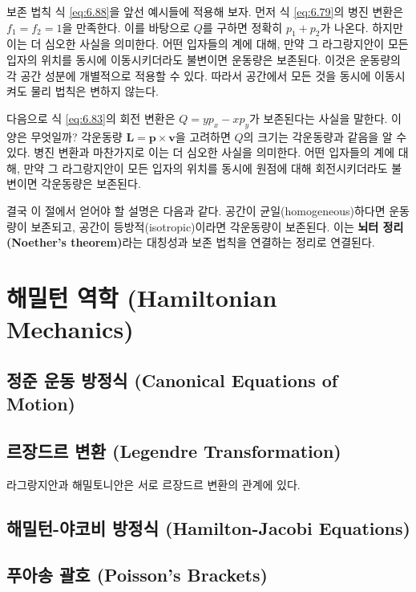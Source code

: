 \documentclass[chapter, oneside, b5paper]{oblivoir}
\theoremstyle{plain}
\theoremstyle{definition}
\theoremstyle{remark}
\begin{document}
보존 법칙 식 \ref{eq:6.88}을 앞선 예시들에 적용해 보자. 먼저 식 \ref{eq:6.79}의 병진 변환은 $f_1 = f_2 = 1$을 만족한다. 이를 바탕으로 $Q$를 구하면 정확히 $p_1 + p_2$가 나온다. 하지만 이는 더 심오한 사실을 의미한다. 어떤 입자들의 계에 대해, 만약 그 라그랑지안이 모든 입자의 위치를 동시에 이동시키더라도 불변이면 운동량은 보존된다. 이것은 운동량의 각 공간 성분에 개별적으로 적용할 수 있다. 따라서 공간에서 모든 것을 동시에 이동시켜도 물리 법칙은 변하지 않는다.

다음으로 식 \ref{eq:6.83}의 회전 변환은 $Q = yp_x - xp_y$가 보존된다는 사실을 말한다. 이 양은 무엇일까? 각운동량 $\mathbf{L} = \mathbf{p} \times \mathbf{v}$을 고려하면 $Q$의 크기는 각운동량과 같음을 알 수 있다. 병진 변환과 마찬가지로 이는 더 심오한 사실을 의미한다. 어떤 입자들의 계에 대해, 만약 그 라그랑지안이 모든 입자의 위치를 동시에 원점에 대해 회전시키더라도 불변이면 각운동량은 보존된다. 

결국 이 절에서 얻어야 할 설명은 다음과 같다. 공간이 균일(homogeneous)하다면 운동량이 보존되고, 공간이 등방적(isotropic)이라면 각운동량이 보존된다. 이는 \textbf{뇌터 정리(Noether's theorem)}라는 대칭성과 보존 법칙을 연결하는 정리로 연결된다.

\newpage
\chapter{해밀턴 역학 (Hamiltonian Mechanics)}

\section{정준 운동 방정식 (Canonical Equations of Motion)}
\section{르장드르 변환 (Legendre Transformation)}
라그랑지안과 해밀토니안은 서로 르장드르 변환의 관계에 있다.
\section{해밀턴-야코비 방정식 (Hamilton-Jacobi Equations)}

\section{푸아송 괄호 (Poisson's Brackets)}
\end{document}
